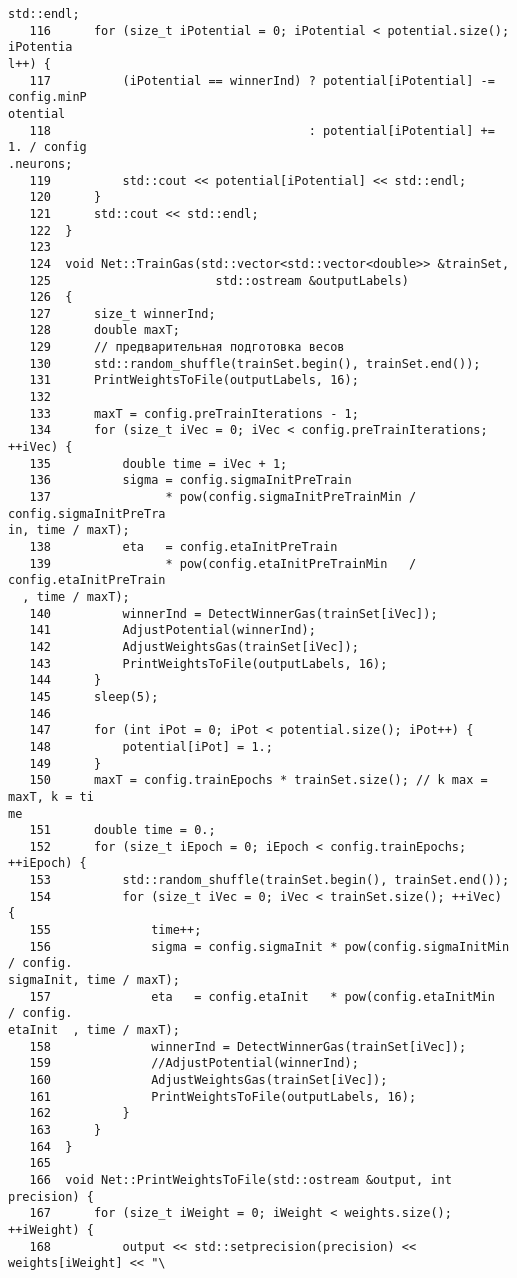 \begin{verbatim}
std::endl;
   116	    for (size_t iPotential = 0; iPotential < potential.size(); iPotentia
l++) {
   117	        (iPotential == winnerInd) ? potential[iPotential] -= config.minP
otential
   118	                                  : potential[iPotential] += 1. / config
.neurons;
   119	        std::cout << potential[iPotential] << std::endl;
   120	    }
   121	    std::cout << std::endl;
   122	}
   123	
   124	void Net::TrainGas(std::vector<std::vector<double>> &trainSet,
   125	                     std::ostream &outputLabels) 
   126	{
   127	    size_t winnerInd;
   128	    double maxT;
   129	    // предварительная подготовка весов
   130	    std::random_shuffle(trainSet.begin(), trainSet.end());
   131	    PrintWeightsToFile(outputLabels, 16);
   132	
   133	    maxT = config.preTrainIterations - 1; 
   134	    for (size_t iVec = 0; iVec < config.preTrainIterations; ++iVec) {
   135	        double time = iVec + 1;  
   136	        sigma = config.sigmaInitPreTrain 
   137	              * pow(config.sigmaInitPreTrainMin / config.sigmaInitPreTra
in, time / maxT);
   138	        eta   = config.etaInitPreTrain   
   139	              * pow(config.etaInitPreTrainMin   / config.etaInitPreTrain
  , time / maxT);
   140	        winnerInd = DetectWinnerGas(trainSet[iVec]);
   141	        AdjustPotential(winnerInd);
   142	        AdjustWeightsGas(trainSet[iVec]);
   143	        PrintWeightsToFile(outputLabels, 16);
   144	    }
   145	    sleep(5);
   146	
   147	    for (int iPot = 0; iPot < potential.size(); iPot++) {
   148	        potential[iPot] = 1.;
   149	    }
   150	    maxT = config.trainEpochs * trainSet.size(); // k max = maxT, k = ti
me
   151	    double time = 0.;
   152	    for (size_t iEpoch = 0; iEpoch < config.trainEpochs; ++iEpoch) {
   153	        std::random_shuffle(trainSet.begin(), trainSet.end());
   154	        for (size_t iVec = 0; iVec < trainSet.size(); ++iVec) {
   155	            time++;
   156	            sigma = config.sigmaInit * pow(config.sigmaInitMin / config.
sigmaInit, time / maxT);
   157	            eta   = config.etaInit   * pow(config.etaInitMin   / config.
etaInit  , time / maxT);
   158	            winnerInd = DetectWinnerGas(trainSet[iVec]);
   159	            //AdjustPotential(winnerInd);
   160	            AdjustWeightsGas(trainSet[iVec]);
   161	            PrintWeightsToFile(outputLabels, 16);
   162	        }
   163	    }
   164	}
   165	
   166	void Net::PrintWeightsToFile(std::ostream &output, int precision) {
   167	    for (size_t iWeight = 0; iWeight < weights.size(); ++iWeight) {
   168	        output << std::setprecision(precision) << weights[iWeight] << "\

\end{verbatim}
